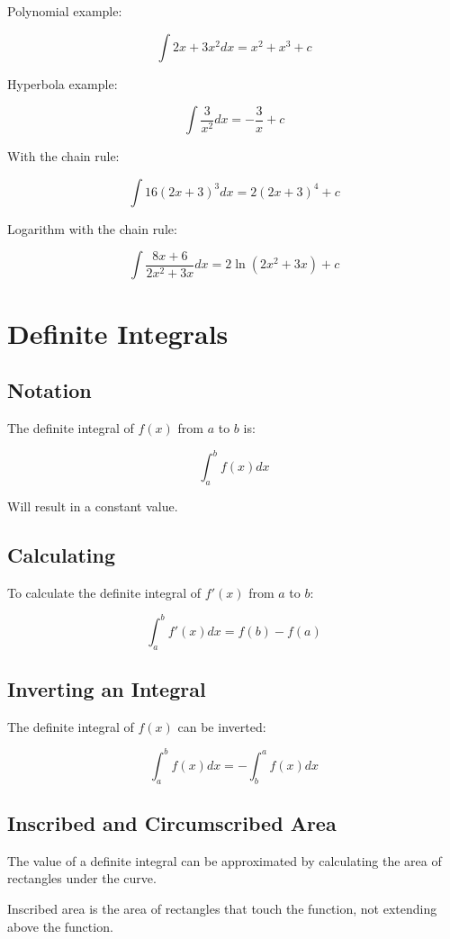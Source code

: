 \documentclass[a4paper,11pt]{article}
\begin{document}
Polynomial example:

$$
\int 2x + 3x^2 dx = x^2 + x^3 + c
$$

Hyperbola example:

$$
\int \frac{3}{x^2} dx = -\frac{3}{x} + c
$$

With the chain rule:

$$
\int 16(2x + 3)^3 dx = 2(2x + 3)^4 + c
$$

Logarithm with the chain rule:

$$
\int \frac{8x + 6}{2x^2 + 3x} dx = 2 \ln(2x^2 + 3x) + c
$$




\section{Definite Integrals}

\subsection{Notation}

The definite integral of $f(x)$ from $a$ to $b$ is:

$$
\int_a^b f(x) dx
$$

Will result in a constant value.


\subsection{Calculating}

To calculate the definite integral of $f'(x)$ from $a$ to $b$:

$$
\int_a^b f'(x) dx = f(b) - f(a)
$$


\subsection{Inverting an Integral}

The definite integral of $f(x)$ can be inverted:

$$
\int_a^b f(x) dx = -\int_b^a f(x) dx
$$


\subsection{Inscribed and Circumscribed Area}

The value of a definite integral can be approximated by calculating the area of
rectangles under the curve.

Inscribed area is the area of rectangles that touch the function, not extending
above the function.
\end{document}
